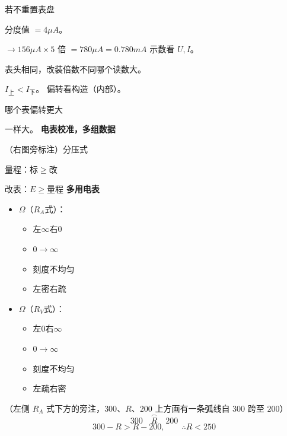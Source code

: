 若不重置表盘

分度值 $=4\unit{\mu A}$。

$\to 156\unit{\mu A}\times 5$ 倍 $=780\unit{\mu A}=0.780\unit{mA}$
示数看 $U,I$。


表头相同，改装倍数不同\quad 哪个读数大。

$I_{\text{上}}<I_{\text{下}}$。
偏转看构造（内部）。

哪个表偏转更大


一样大。
\textbf{电表校准，多组数据}


（右图旁标注）分压式

量程：标$\ge$改

改表：$E\ge$量程
\textbf{多用电表}

\begin{itemize}
\item $\Omega$（$R_A$式）：
  \begin{itemize}
  \item 左$\infty$右$0$
  \item $0\to\infty$
  \item 刻度不均匀
  \item 左密右疏
  \end{itemize}
\item $\Omega$（$R_V$式）：
  \begin{itemize}
  \item 左$0$右$\infty$
  \item $0\to\infty$
  \item 刻度不均匀
  \item 左疏右密
  \end{itemize}
\end{itemize}

（左侧 $R_A$ 式下方的旁注，$300$、$R$、$200$ 上方画有一条弧线自 $300$ 跨至 $200$）
\[
\overset{\frown}{300\quad R\quad 200}
\]
\[
300-R>R-200,\qquad \therefore R<250
\]

